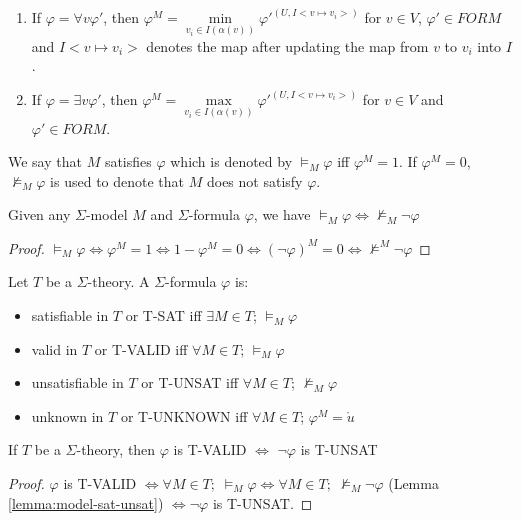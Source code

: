 \begin{definition}
\begin{enumerate}
\item If $\varphi = \forall v \varphi'$, then $\varphi^M = \min\limits_{v_i \in I(\alpha(v))}\varphi'^{(U, I<v \mapsto v_i>)}$ for $v \in V$,  $\varphi' \in FORM$ and ${I<v \mapsto v_i>}$ denotes the map after updating the map from $v$ to $v_i$ into $I$.
\item If $\varphi = \exists v \varphi'$, then $\varphi^M = \max\limits_{v_i \in I(\alpha(v))}\varphi'^{(U, I<v \mapsto v_i>)}$ for $v \in V$ and  $\varphi' \in FORM$.
\end{enumerate}
We say that $M$ satisfies $\varphi$ which is denoted by $\models_M \varphi$ iff $\varphi^M = 1$. If $\varphi^M = 0$, $\not\models_M \varphi$ is used to denote that $M$ does not satisfy $\varphi$.
\end{definition}

\begin{lemma}\label{lemma:model-sat-unsat}
Given any $\Sigma$-model $M$ and $\Sigma$-formula $\varphi$, we have $\models_M \varphi \iff \not\models_M \neg \varphi$
\end{lemma}

\begin{proof}
$\models_M \varphi \iff \varphi^M = 1 \iff 1 - \varphi^M = 0 \iff (\neg \varphi)^M = 0 \iff \not\models^M \neg \varphi$
\end{proof}

\begin{definition}
Let $T$ be a $\Sigma$-theory. A $\Sigma$-formula $\varphi$ is:
\begin{itemize}
\item satisfiable in $T$ or T-SAT iff $\exists M \in T$; $\models_{M} \varphi$
\item valid in $T$ or T-VALID iff $\forall M \in T$; $\models_{M} \varphi$
\item unsatisfiable in $T$ or T-UNSAT iff $\forall M \in T$; $\not\models_{M} \varphi$
\item unknown in $T$ or T-UNKNOWN iff $\forall M \in T$; $\varphi^M = \mathring{u}$
\end{itemize}
\end{definition}

\begin{lemma} \label{lemma:theory-valid-unsat}
If $T$ be a $\Sigma$-theory, then $\varphi$ is T-VALID $\iff$ $\neg\varphi$ is T-UNSAT
\end{lemma}

\begin{proof}
$\varphi$ is T-VALID $\iff \forall M \in T; \; \models_{M} \varphi \iff \forall M \in T; \; \not\models_{M} \neg\varphi$ (Lemma \ref{lemma:model-sat-unsat}) $\iff \neg\varphi$ is T-UNSAT.
\end{proof}


